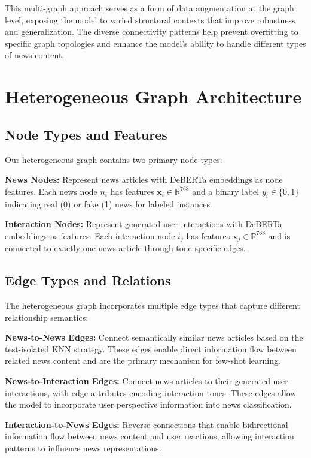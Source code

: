 This multi-graph approach serves as a form of data augmentation at the graph level, exposing the model to varied structural contexts that improve robustness and generalization. The diverse connectivity patterns help prevent overfitting to specific graph topologies and enhance the model's ability to handle different types of news content.

\section{Heterogeneous Graph Architecture}

\subsection{Node Types and Features}

Our heterogeneous graph contains two primary node types:

\textbf{News Nodes:} Represent news articles with DeBERTa embeddings as node features. Each news node $n_i$ has features $\mathbf{x}_i \in \mathbb{R}^{768}$ and a binary label $y_i \in \{0, 1\}$ indicating real (0) or fake (1) news for labeled instances.

\textbf{Interaction Nodes:} Represent generated user interactions with DeBERTa embeddings as features. Each interaction node $i_j$ has features $\mathbf{x}_j \in \mathbb{R}^{768}$ and is connected to exactly one news article through tone-specific edges.

\subsection{Edge Types and Relations}

The heterogeneous graph incorporates multiple edge types that capture different relationship semantics:

\textbf{News-to-News Edges:} Connect semantically similar news articles based on the test-isolated KNN strategy. These edges enable direct information flow between related news content and are the primary mechanism for few-shot learning.

\textbf{News-to-Interaction Edges:} Connect news articles to their generated user interactions, with edge attributes encoding interaction tones. These edges allow the model to incorporate user perspective information into news classification.

\textbf{Interaction-to-News Edges:} Reverse connections that enable bidirectional information flow between news content and user reactions, allowing interaction patterns to influence news representations.

